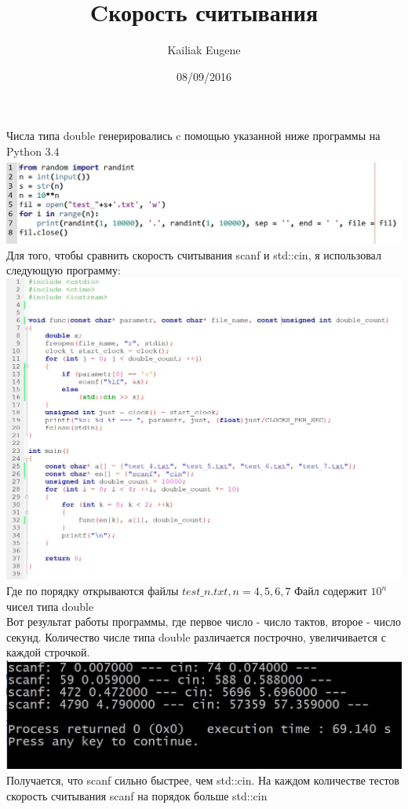 \documentclass[12pt]{article}
\title{Cкорость считывания}
\date{08/09/2016}
\author{Kailiak Eugene}
\begin{document}
\maketitle
Числа типа double генерировались c помощью указанной ниже программы на Python 3.4\\
\includegraphics{make_test} \\

Для того, чтобы сравнить скорость считывания scanf и std::cin, я использовал следующую программу: \\
\includegraphics[width=18cm]{Programm} \\

Где по порядку открываются файлы $test\_n.txt, n = 4,5,6,7$ Файл содержит $10^n$ чисел типа double \\
Вот результат работы программы, где первое число - число тактов, второе - число секунд. Количество числе типа double различается построчно, увеличивается с каждой строчкой. \\
\includegraphics{Results} \\
Получается, что scanf сильно быстрее, чем std::cin. На каждом количестве тестов скорость считывания scanf на порядок больше std::cin \\
\end{document}
